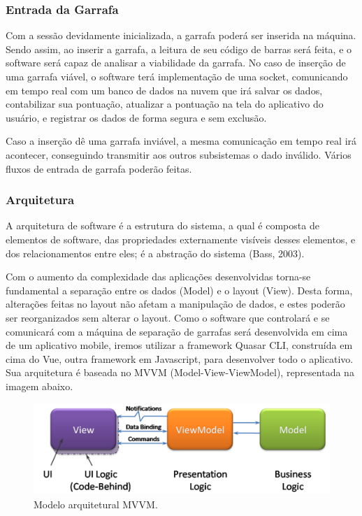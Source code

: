 \subsubsection{Entrada da Garrafa}
    Com a sessão devidamente inicializada, a garrafa poderá ser inserida na máquina. Sendo assim, ao inserir a garrafa, a leitura de seu código de barras será feita, e o software será capaz de analisar a viabilidade da garrafa. No caso de inserção de uma garrafa viável, o software terá implementação de uma socket, comunicando em tempo real com um banco de dados na nuvem que irá salvar os dados, contabilizar sua pontuação, atualizar a pontuação na tela do aplicativo do usuário, e registrar os dados de forma segura e sem exclusão. 

    Caso a inserção dê uma garrafa inviável, a mesma comunicação em tempo real irá acontecer, conseguindo transmitir aos outros subsistemas o dado inválido. Vários fluxos de entrada de garrafa poderão feitas.

\subsubsection{Arquitetura}
    A arquitetura de software é a estrutura do sistema, a qual é composta de elementos de software, das propriedades externamente visíveis desses elementos, e dos relacionamentos entre eles; é a abstração do sistema (Bass, 2003). 

    Com o aumento da complexidade das aplicações desenvolvidas torna-se fundamental a separação entre os dados (Model) e o layout (View). Desta forma, alterações feitas no layout não afetam a manipulação de dados, e estes poderão ser reorganizados sem alterar o layout. Como o software que controlará e se comunicará com a máquina de separação de garrafas será desenvolvida em cima de um aplicativo mobile, iremos utilizar a framework Quasar CLI, construída em cima do Vue, outra framework em Javascript, para desenvolver todo o aplicativo. Sua arquitetura é baseada no MVVM (Model-View-ViewModel), representada na imagem abaixo.

\begin{figure}[!ht]
	\centering
		\includegraphics[scale=1]{figuras/mvvm}
	\caption{Modelo arquitetural MVVM.}
\end{figure}

